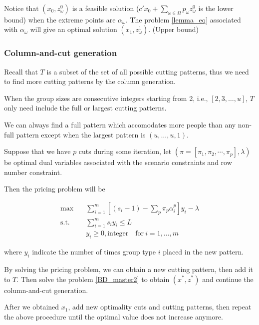 Notice that $(x_0, z_{\omega}^{0})$ is a feasible solution ($c{'} x_0 + \sum_{\omega \in \Omega} p_{\omega} z_{\omega}^{0}$ is the lower bound) when the extreme points are $\alpha_{\omega}$. The problem \eqref{lemma_eq} associated with $\alpha_{\omega}$ will give an optimal solution $(x_1, z_{\omega}^{1})$. (Upper bound)

\subsubsection{Column-and-cut generation}

Recall that $T$ is a subset of the set of all possible cutting patterns, thus we need to find more cutting patterns by the column generation.

\begin{lem}\label{full_cutting_pattern}
When the group sizes are consecutive integers starting from 2, i.e., $[2,3,\ldots,u]$, $T$ only need include the full or largest cutting patterns.
\end{lem}

We can always find a full pattern which accomodates more people than any non-full pattern except when the largest pattern is $(u, \ldots, u, 1)$.

Suppose that we have $p$ cuts during some iteration, let $(\pi=\left[\pi_{1}, \pi_{2},\cdots,\pi_{p}\right],\lambda)$ be optimal dual variables associated with the scenario constraints and row number constraint.

Then the pricing problem will be

\begin{equation}\label{add_cutting_pattern}
  \begin{aligned}
  \mbox{max}\quad & \sum_{i=1}^m \left[(s_i-1) -\sum_{p}\pi_{p}\alpha_{i}^{p} \right] y_{i} - \lambda \\
  \mbox{s.t.} \quad & \sum_{i=1}^m s_i y_i \leq L  \\
  & y_i \geq 0, \mbox{integer}\quad \mbox{for}~ i=1,\ldots,m
\end{aligned}
\end{equation}

where $y_i$ indicate the number of times group type $i$ placed in the new pattern.

By solving the pricing problem, we can obtain a new cutting pattern, then add it to $T$. Then solve the problem \eqref{BD_master2} to obtain $(x^{*}, z^{*})$ and continue the column-and-cut generation.

After we obtained $x_1$, add new optimality cuts and cutting patterns, then repeat the above procedure until the optimal value does not increase anymore.


